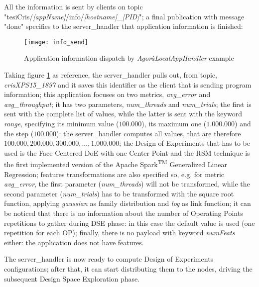 All the information is sent by clients on topic "tesiCris\slash{}\textit{[appName]}\slash{}info\slash{}\textit{[hostname]\_[PID]}"; a final publication with message "done" specifies to the server\_handler that application information is finished:

\begin{figure}[H]

    \centering
    \texttt{[image: info\_send]}
    \caption{Application information dispatch by \textit{AgoràLocalAppHandler} example}
    \label{fig:info_send}
    
\end{figure}

Taking figure \ref{fig:info_send} as reference, the server\_handler pulls out, from topic, \textit{crisXPS15\_1897} and it saves this identifier as the client that is sending program information; this application focuses on two metrics, \textit{avg\_error} and \textit{avg\_throughput}; it has two parameters, \textit{num\_threads} and \textit{num\_trials}; the first is sent with the complete list of values, while the latter is sent with the keyword \textit{range}, specifying its minimum value ($100.000$), its maximum one ($1.000.000$) and the step ($100.000$): the server\_handler computes all values, that are therefore $100.000, 200.000, 300.000, ..., 1.000.000$; the Design of Experiments that has to be used is the Face Centered DoE with one Center Point and the RSM technique is the first implemented version of the Apache Spark\textsuperscript{TM} Generalized Linear Regression; features transformations are also specified so, e.g. for metric \textit{avg\_error}, the first parameter (\textit{num\_threads}) will not be transformed, while the second parameter (\textit{num\_trials}) has to be transformed with the square root function, applying \textit{gaussian} as family distribution and \textit{log} as link function; it can be noticed that there is no information about the number of Operating Points repetitions to gather during DSE phase: in this case the default value is used (one repetition for each OP); finally, there is no payload with keyword \textit{numFeats} either: the application does not have features.

The server\_handler is now ready to compute Design of Experiments configurations; after that, it can start distributing them to the nodes, driving the subsequent Design Space Exploration phase.





